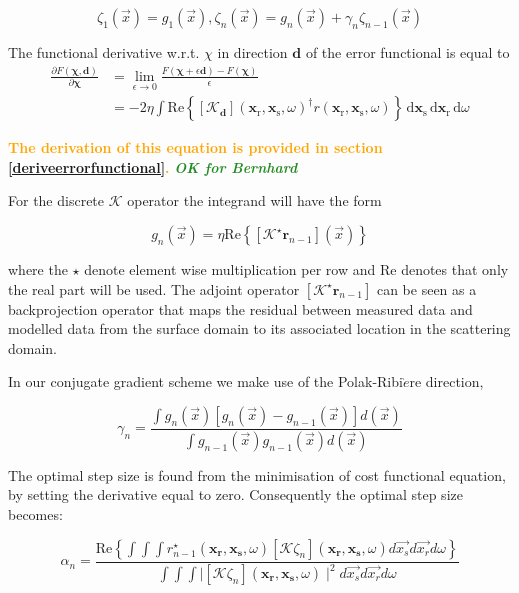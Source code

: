\documentclass[10pt,a4paper]{article}
\newcommand{\partder}[2]{\ensuremath{\frac{\partial #1}{\partial #2}}}
\newcommand{\df}[1]{\, \ensuremath{\mbox{d}#1}}
\newcommand{\real}[1]{\text{Re} \left\{ #1 \right\}}
\newcommand{\newstmtwo}[1]{\textcolor{orange}{\textbf{#1}}}
\newcommand{\brok}{\textcolor{ForestGreen}{\textit{\textbf{OK for Bernhard}}}}
\newcommand{\xs}{\mathbf{x}_\text{s}}
\newcommand{\xr}{\mathbf{x}_\text{r}}
\begin{document}
\begin{equation} \label{eq:eq14}\zeta_1(\vec{x}) = g_1(\vec{x})
,\zeta_n(\vec{x}) = g_n(\vec{x}) + \gamma_n\zeta_{n-1}(\vec{x})
\end{equation}

The functional derivative w.r.t. $\chi$ in direction $\mathbf{d}$ of
the error functional is equal to
\begin{subequations}
\begin{align}
\partder{F(\mathbf{\chi}, \mathbf{d})}{\mathbf{\chi}} & =
\lim_{\epsilon \rightarrow 0} \frac{F(\mathbf{\chi} + \epsilon
\mathbf{d}) - F(\mathbf{\chi})}{\epsilon} \\
& = -2 \eta \int \real{\left[\mathcal{K}_\mathbf{d} \right](\xr, \xs,
\omega)^{\dagger} r (\xr, \xs, \omega)} \df{\xs} \df{\xr} \df{\omega}
\label{eq:hi}
\end{align}
\end{subequations}

\newstmtwo{The derivation of this equation is provided in section
\ref{deriveerrorfunctional}.}
{\brok}

For the discrete $\mathcal{K}$ operator the integrand will have the form

\begin{equation} \label{eq:eq15} g_n(\vec{x}) = \eta
\real{[\mathcal{K}^\star\mathbf{r}_{n-1}](\vec{x})} \end{equation}

where the $\star$ denote element wise multiplication per row and Re
denotes that only the real part will be used.
The adjoint operator $[\mathcal{K}^\star\mathbf{r}_{n-1}]$ can be seen
as a backprojection operator that maps the residual between measured
data and modelled data from the surface domain to its associated
location in the scattering domain.

In our conjugate gradient scheme we make use of the
Polak-Ribi$\grave{e}$re direction,

\begin{equation} \label{eq:eq16} \gamma_n = \frac{\int
g_n(\vec{x})[g_n(\vec{x})-g_{n-1}(\vec{x})]d(\vec{x})}{\int
g_{n-1}(\vec{x}) g_{n-1}(\vec{x})d(\vec{x})} \end{equation}

The optimal step size is found from the minimisation of cost
functional equation, by setting the derivative equal to zero.
Consequently the optimal step size becomes:

\begin{equation} \label{eq:eq17} \alpha_n = \frac {\real {\int \int
\int r^{\star}_{n-1}(\mathbf{x_\text{r}},\mathbf{x_\text{s}},\omega)[\mathcal{K}
\zeta_n](\mathbf{x_\text{r}},\mathbf{x_\text{s}},\omega)d\vec{x_s}d\vec{x_r}d\omega}}{\int
\int \int \mid[\mathcal{K}
\zeta_n](\mathbf{x_\text{r}},\mathbf{x_\text{s}},\omega) \mid^2
d\vec{x_s}d\vec{x_r}d\omega} \end{equation}
\end{document}
